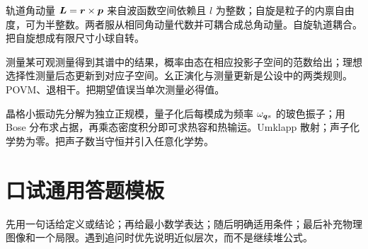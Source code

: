 {轨道角动量 $\bm{L}=\bm{r}\times\bm{p}$ 来自波函数空间依赖且 $l$ 为整数；自旋是粒子的内禀自由度，可为半整数。两者服从相同角动量代数并可耦合成总角动量。}{自旋轨道耦合。}{把自旋想成有限尺寸小球自转。}

{测量某可观测量得到其谱中的结果，概率由态在相应投影子空间的范数给出；理想选择性测量后态更新到对应子空间。幺正演化与测量更新是公设中的两类规则。}{POVM、退相干。}{把期望值误当单次测量必得值。}

{晶格小振动先分解为独立正规模，量子化后每模成为频率 $\omega_{\bm{q} s}$ 的玻色振子；用 Bose 分布求占据，再乘态密度积分即可求热容和热输运。}{Umklapp 散射；声子化学势为零。}{把声子数当守恒并引入任意化学势。}

\section{口试通用答题模板}
先用一句话给定义或结论；再给最小数学表达；随后明确适用条件；最后补充物理图像和一个局限。遇到追问时优先说明近似层次，而不是继续堆公式。

